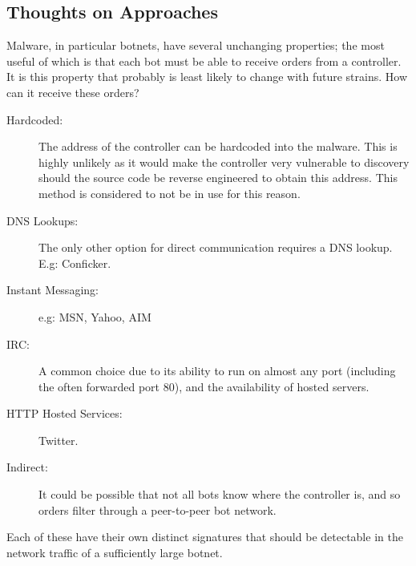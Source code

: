 \documentclass{article}
\theoremstyle{remark}
\theoremstyle{definition}
\theoremstyle{definition}
\theoremstyle{definition}
\begin{document}
\subsection{Thoughts on Approaches}
Malware, in particular botnets, have several unchanging properties; the most useful of which is that each bot must be able to receive orders from a controller. It is this property that probably is least likely to change with future strains. How can it receive these orders?

\begin{description}
\item[Hardcoded: ] The address of the controller can be hardcoded into the malware. This is highly unlikely as it would make the controller very vulnerable to discovery should the source code be reverse engineered to obtain this address. This method is considered to not be in use for this reason.
\item[DNS Lookups: ] The only other option for direct communication requires a DNS lookup. E.g: Conficker.
\item[Instant Messaging: ] e.g: MSN, Yahoo, AIM
\item[IRC: ] A common choice due to its ability to run on almost any port (including the often forwarded port 80), and the availability of hosted servers.
\item[HTTP Hosted Services: ] Twitter.
\item[Indirect: ] It could be possible that not all bots know where the controller is, and so orders filter through a peer-to-peer bot network.
\end{description}

Each of these have their own distinct signatures that should be detectable in the network traffic of a sufficiently large botnet.
\end{document}
